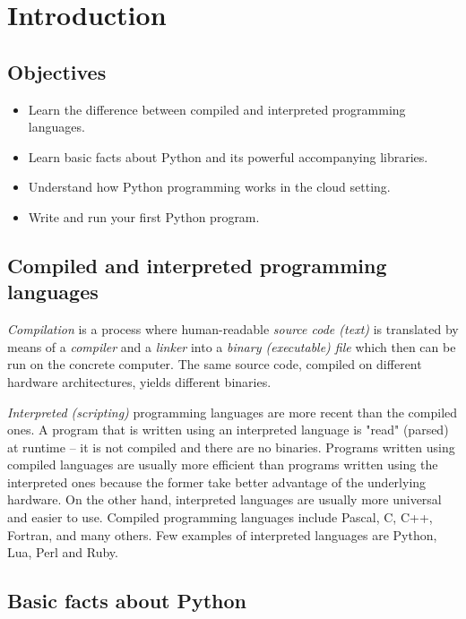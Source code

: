 \setcounter{section}{0}
\section{Introduction}

\subsection{Objectives}

\begin{itemize}
\item Learn the difference between compiled and interpreted programming languages.
\item Learn basic facts about Python and its powerful accompanying libraries.
\item Understand how Python programming works in the cloud setting.
\item Write and run your first Python program.
\end{itemize}

\subsection{Compiled and interpreted programming languages}

{\em Compilation} is a process where human-readable {\em source code (text)} is translated by
means of a {\em compiler} and a {\em linker}
into a {\em binary (executable) file} which then can be run on the concrete computer. The same 
source code, compiled on different hardware architectures, yields different binaries. 

{\em Interpreted (scripting)} programming languages are more recent than the compiled ones. 
A program that is written using an interpreted language is "read" (parsed) at runtime -- it is 
not compiled and there are no binaries. Programs 
written using compiled languages are usually more efficient than programs written using the interpreted 
ones because the former take better advantage of the underlying hardware. On the other hand,
interpreted languages are usually more universal and easier to use. Compiled 
programming languages include Pascal, C, C++, Fortran, and many others. Few examples of interpreted 
languages are Python, Lua, Perl and Ruby. 

\subsection{Basic facts about Python}

